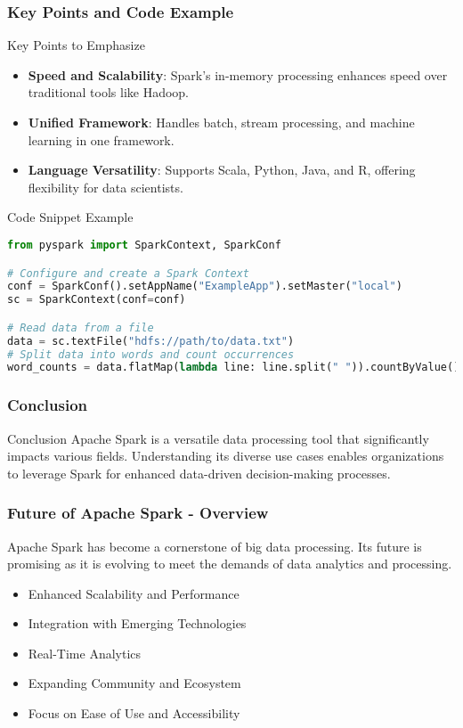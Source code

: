 \documentclass[aspectratio=169]{beamer}
\begin{document}
\begin{frame}[fragile]
    \frametitle{Key Points and Code Example}
    \begin{block}{Key Points to Emphasize}
        \begin{itemize}
            \item \textbf{Speed and Scalability}: Spark's in-memory processing enhances speed over traditional tools like Hadoop.
            \item \textbf{Unified Framework}: Handles batch, stream processing, and machine learning in one framework.
            \item \textbf{Language Versatility}: Supports Scala, Python, Java, and R, offering flexibility for data scientists.
        \end{itemize}
    \end{block}

    \begin{block}{Code Snippet Example}
        \begin{lstlisting}[language=Python]
from pyspark import SparkContext, SparkConf

# Configure and create a Spark Context
conf = SparkConf().setAppName("ExampleApp").setMaster("local")
sc = SparkContext(conf=conf)

# Read data from a file
data = sc.textFile("hdfs://path/to/data.txt")
# Split data into words and count occurrences
word_counts = data.flatMap(lambda line: line.split(" ")).countByValue()
        \end{lstlisting}
    \end{block}
\end{frame}

\begin{frame}
    \frametitle{Conclusion}
    \begin{block}{Conclusion}
        Apache Spark is a versatile data processing tool that significantly impacts various fields. Understanding its diverse use cases enables organizations to leverage Spark for enhanced data-driven decision-making processes.
    \end{block}
\end{frame}

\begin{frame}[fragile]
  \frametitle{Future of Apache Spark - Overview}
  Apache Spark has become a cornerstone of big data processing. Its future is promising as it is evolving to meet the demands of data analytics and processing. 
  \begin{itemize}
    \item Enhanced Scalability and Performance
    \item Integration with Emerging Technologies
    \item Real-Time Analytics
    \item Expanding Community and Ecosystem
    \item Focus on Ease of Use and Accessibility
  \end{itemize}
\end{frame}
\end{document}
